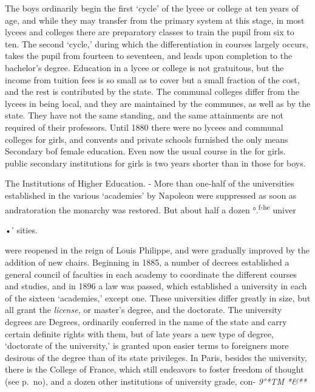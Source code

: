 \documentclass[]{book}
\begin{document}
The boys ordinarily begin the first `cycle' of the lycee or college at ten years of age, and while they may transfer from the primary system at this stage, in most lycees and colleges there are preparatory classes to train the pupil from six to ten. The second `cycle,' during which the differentiation in courses largely occurs, takes the pupil from fourteen to seventeen, and leads upon completion to the bachelor's degree. Education in a lycee or college is not gratuitous, but the income from tuition fees is so small as to cover but a small fraction of the cost, and the rest is contributed by the state. The communal colleges differ from the lycees in being local, and they are maintained by the communes, as well as by the state.\protect\hypertarget{ch25.xmlux5cux23para.462.1.0.box.103.252.1268.368.q.60}{}{ They have not the same standing, and the same attainments are not required of their professors. Until 1880 there were no lycees and communal colleges for girls, and convents and private schools furnished the only means Secondary bof female education. Even now the usual course in the for girls. public secondary institutions for girls is two years shorter than in those for boys.}

The Institutions of Higher Education. - More than one-half of the universities established in the various `academies' by Napoleon were suppressed as soon as andratoration the monarchy was restored. But about half a dozen °.\textsuperscript{f}'\textsuperscript{he} univer

•' sities.

were reopened in the reign of Louis Philippe, and were gradually improved by the addition of new chairs. Beginning in 1885, a number of decrees established a general council of faculties in each academy to coordinate the different courses and studies, and in 1896 a law was passed, which established a university in each of the sixteen `academies,' except one. These universities differ greatly in size, but all grant the \emph{license,} or master's degree, and the doctorate. The university degrees are Degrees, ordinarily conferred in the name of the state and carry certain definite rights with them, but of late years a new type of degree, `doctorate of the university,' is granted upon easier terms to foreigners more desirous of the degree than of its state privileges. In Paris, besides the university, there is the College of France, which still endeavors to foster freedom of thought (see p.~no), and a dozen other institutions of university grade, con- \emph{9°*TM *\&**}
\end{document}
